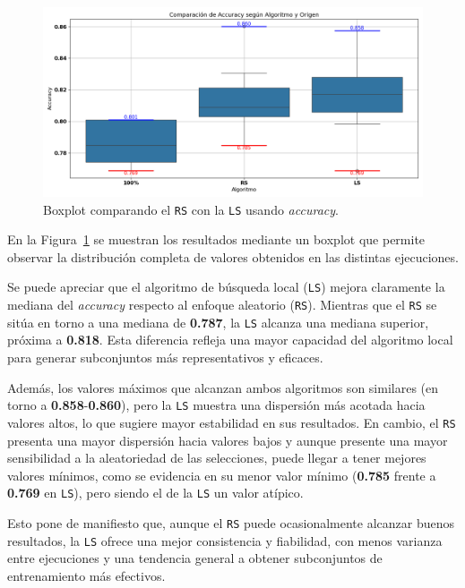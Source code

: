 \begin{figure}[htp]
    \centering
    \includegraphics[width=1\textwidth]{imagenes/evaluaciones/comparacion_rs-ls.png}
    \caption{Boxplot comparando el \texttt{RS} con la \texttt{LS} usando \textit{accuracy}.}
    \label{fig:aleatorio-vs-busqueda-local}
\end{figure}
En la Figura~\ref{fig:aleatorio-vs-busqueda-local} se muestran los resultados mediante un boxplot que permite observar
la distribución completa de valores obtenidos en las distintas ejecuciones.

Se puede apreciar que el algoritmo de búsqueda local (\texttt{LS}) mejora claramente la mediana del \textit{accuracy} respecto al enfoque aleatorio (\texttt{RS}).
Mientras que el \texttt{RS} se sitúa en torno a una mediana de \textbf{0.787}, la \texttt{LS} alcanza una mediana superior, próxima a \textbf{0.818}.
Esta diferencia refleja una mayor capacidad del algoritmo local para generar subconjuntos más representativos y eficaces.

Además, los valores máximos que alcanzan ambos algoritmos son similares (en torno a \textbf{0.858}-\textbf{0.860}),
pero la \texttt{LS} muestra una dispersión más acotada hacia valores altos, lo que sugiere mayor estabilidad en sus resultados.
En cambio, el \texttt{RS} presenta una mayor dispersión hacia valores bajos y aunque presente una mayor sensibilidad a la aleatoriedad de las selecciones,
puede llegar a tener mejores valores mínimos, como se evidencia en su menor valor mínimo (\textbf{0.785} frente a \textbf{0.769} en \texttt{LS}),
pero siendo el de la \texttt{LS} un valor atípico.

Esto pone de manifiesto que, aunque el \texttt{RS} puede ocasionalmente alcanzar buenos resultados,
la \texttt{LS} ofrece una mejor consistencia y fiabilidad, con menos varianza entre ejecuciones y una tendencia general a obtener subconjuntos de entrenamiento más efectivos.


